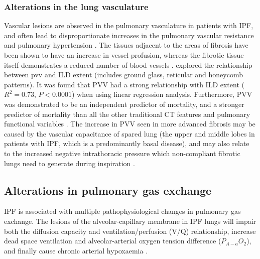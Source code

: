 \subsubsection{Alterations in the lung vasculature} \label{VasculatureAlterations}
Vascular lesions are observed in the pulmonary vasculature in patients with IPF, and often lead to disproportionate increases in the pulmonary vascular resistance and pulmonary hypertension \citep{plantier2018physiology}. The tissues adjacent to the areas of fibrosis have been shown to have an increase in vessel profusion, whereas the fibrotic tissue itself demonstrates a reduced number of blood vessels \citep{cosgrove2004pigment,ebina2004heterogeneous}. \cite{Jacob2016Evaluation} explored the relationship between \gls{pvv} and ILD extent (includes ground glass, reticular and honeycomb patterns). It was found that PVV had a strong relationship with ILD extent ($R^2 = 0.73$, $P < 0.0001$) when using linear regression analysis. Furthermore, PVV was demonstrated to be an independent predictor of mortality, and a stronger predictor of mortality than all the other traditional CT features and pulmonary functional variables \citep{Jacob2016Evaluation}. The increase in PVV seen in more advanced fibrosis may be caused by the vascular capacitance of spared lung (the upper and middle lobes in patients with IPF, which is a predominantly basal disease), and may also relate to the increased negative intrathoracic pressure which non-compliant fibrotic lungs need to generate during inspiration \citep{Jacob2016Mortality}.

\subsection{Alterations in pulmonary gas exchange}
IPF is associated with multiple pathophysiological changes in pulmonary gas exchange. The lesions of the alveolar-capillary membrane in IPF lungs will impair both the diffusion capacity and ventilation/perfusion (V/Q) relationship, increase dead space ventilation and alveolar-arterial oxygen tension difference ($P_{A-a}O_2$), and finally cause chronic arterial hypoxaemia \citep{crystal1976idiopathic,plantier2018physiology,american2000idiopathic}.


